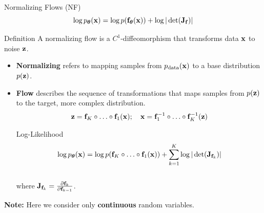\documentclass{beamer}
\begin{document}
\begin{frame}{Normalizing Flows (NF)}
	\vspace{-0.3cm}
	\[
		\log p_{\boldsymbol{\theta}}(\mathbf{x}) = \log p(\mathbf{f}_{\boldsymbol{\theta}}(\mathbf{x})) + \log |\det (\mathbf{J}_{\mathbf{f}})|
	\]
	\vspace{-0.4cm}
	\begin{block}{Definition}
		A normalizing flow is a $C^1$-diffeomorphism that transforms data $\mathbf{x}$ to noise $\mathbf{z}$.
	\end{block}
    \eqpause
	\begin{itemize}
		\item \textbf{Normalizing} refers to mapping samples from $p_{\text{data}}(\mathbf{x})$ to a base distribution $p(\mathbf{z})$.
		\item \textbf{Flow} describes the sequence of transformations that maps samples from $p(\mathbf{z})$ to the target, more complex distribution.
		\[
			\mathbf{z} = \mathbf{f}_K \circ \ldots \circ \mathbf{f}_1(\mathbf{x}); \quad \mathbf{x} = \mathbf{f}_1^{-1} \circ \ldots \circ \mathbf{f}_K^{-1} (\mathbf{z})
		\] 
		\vspace{-0.4cm}
		\eqpause
		\begin{block}{Log-Likelihood}
			\vspace{-0.5cm}
			\[
				\log p_{\boldsymbol{\theta}}(\mathbf{x}) = \log p(\mathbf{f}_K \circ \ldots \circ \mathbf{f}_1(\mathbf{x})) + \sum_{k=1}^K \log |\det (\mathbf{J}_{\mathbf{f}_k})|
			\]
			\vspace{-0.4cm} \\
			where $\mathbf{J}_{\mathbf{f}_k} = \frac{\partial \mathbf{f}_k}{\partial \mathbf{f}_{k-1}}$.
		\end{block}
	\end{itemize}
	\eqpause
	\textbf{Note:} Here we consider only \textbf{continuous} random variables.
\end{frame}
\end{document}
